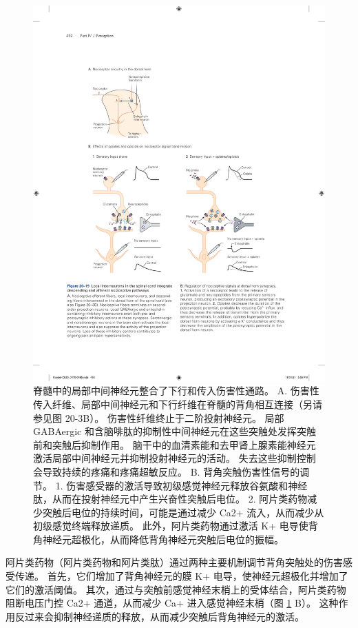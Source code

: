 \begin{figure}[htbp]
	\centering
	\includegraphics[width=1.0\linewidth]{chap20/fig_20_19}
	\caption{脊髓中的局部中间神经元整合了下行和传入伤害性通路。 
		A. 伤害性传入纤维、局部中间神经元和下行纤维在脊髓的背角相互连接（另请参见图 20-3B）。 
		伤害性纤维终止于二阶投射神经元。 
		局部 GABAergic 和含脑啡肽的抑制性中间神经元在这些突触处发挥突触前和突触后抑制作用。 
		脑干中的血清素能和去甲肾上腺素能神经元激活局部中间神经元并抑制投射神经元的活动。 
		失去这些抑制控制会导致持续的疼痛和疼痛超敏反应。 
		B. 背角突触伤害性信号的调节。 
		1. 伤害感受器的激活导致初级感觉神经元释放谷氨酸和神经肽，从而在投射神经元中产生兴奋性突触后电位。 
		2. 阿片类药物减少突触后电位的持续时间，可能是通过减少 Ca2+ 流入，从而减少从初级感觉终端释放递质。 
		此外，阿片类药物通过激活 K+ 电导使背角神经元超极化，从而降低背角神经元突触后电位的振幅。}
	\label{fig:20_19}
\end{figure}


阿片类药物（阿片类药物和阿片类肽）通过两种主要机制调节背角突触处的伤害感受传递。 
首先，它们增加了背角神经元的膜 K+ 电导，使神经元超极化并增加了它们的激活阈值。 
其次，通过与突触前感觉神经末梢上的受体结合，阿片类药物阻断电压门控 Ca2+ 通道，从而减少 Ca+ 进入感觉神经末梢（图 \ref{fig:20_19} B）。 
这种作用反过来会抑制神经递质的释放，从而减少突触后背角神经元的激活。


